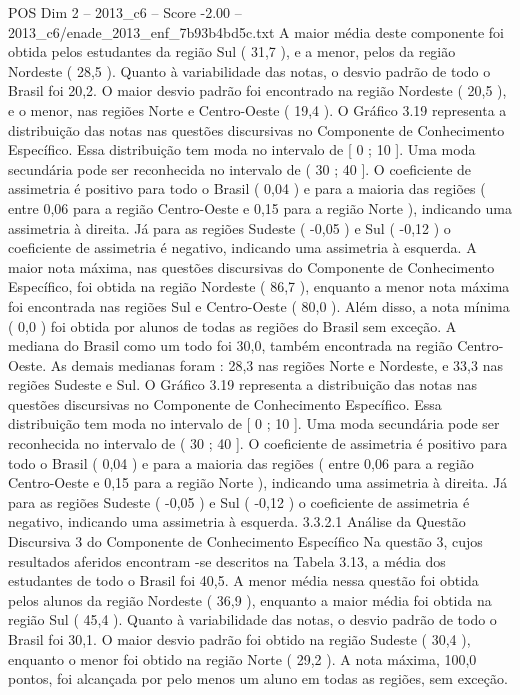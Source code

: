 \begin{textsample}{POS Dim 2 – 2013\_c6 – Score -2.00 – 2013\_c6/enade\_2013\_enf\_7b93b4bd5c.txt}
A maior média deste componente foi obtida pelos estudantes da região Sul ( 31,7 ), e a menor, pelos da região Nordeste ( 28,5 ).
Quanto à variabilidade das notas, o desvio padrão de todo o Brasil foi 20,2.
O maior desvio padrão foi encontrado na região Nordeste ( 20,5 ), e o menor, nas regiões Norte e Centro-Oeste ( 19,4 ).
O Gráfico 3.19 representa a distribuição das notas nas questões discursivas no Componente de Conhecimento Específico.
Essa distribuição tem moda no intervalo de [ 0 ; 10 ].
Uma moda secundária pode ser reconhecida no intervalo de ( 30 ; 40 ].
O coeficiente de assimetria é positivo para todo o Brasil ( 0,04 ) e para a maioria das regiões ( entre 0,06 para a região Centro-Oeste e 0,15 para a região Norte ), indicando uma assimetria à direita.
Já para as regiões Sudeste ( -0,05 ) e Sul ( -0,12 ) o coeficiente de assimetria é negativo, indicando uma assimetria à esquerda.
A maior nota máxima, nas questões discursivas do Componente de Conhecimento Específico, foi obtida na região Nordeste ( 86,7 ), enquanto a menor nota máxima foi encontrada nas regiões Sul e Centro-Oeste ( 80,0 ).
Além disso, a nota mínima ( 0,0 ) foi obtida por alunos de todas as regiões do Brasil sem exceção.
A mediana do Brasil como um todo foi 30,0, também encontrada na região Centro-Oeste.
As demais medianas foram : 28,3 nas regiões Norte e Nordeste, e 33,3 nas regiões Sudeste e Sul.
O Gráfico 3.19 representa a distribuição das notas nas questões discursivas no Componente de Conhecimento Específico.
Essa distribuição tem moda no intervalo de [ 0 ; 10 ].
Uma moda secundária pode ser reconhecida no intervalo de ( 30 ; 40 ].
O coeficiente de assimetria é positivo para todo o Brasil ( 0,04 ) e para a maioria das regiões ( entre 0,06 para a região Centro-Oeste e 0,15 para a região Norte ), indicando uma assimetria à direita.
Já para as regiões Sudeste ( -0,05 ) e Sul ( -0,12 ) o coeficiente de assimetria é negativo, indicando uma assimetria à esquerda. 3.3.2.1 Análise da Questão Discursiva 3 do Componente de Conhecimento Específico Na questão 3, cujos resultados aferidos encontram -se descritos na Tabela 3.13, a média dos estudantes de todo o Brasil foi 40,5.
A menor média nessa questão foi obtida pelos alunos da região Nordeste ( 36,9 ), enquanto a maior média foi obtida na região Sul ( 45,4 ).
Quanto à variabilidade das notas, o desvio padrão de todo o Brasil foi 30,1.
O maior desvio padrão foi obtido na região Sudeste ( 30,4 ), enquanto o menor foi obtido na região Norte ( 29,2 ).
A nota máxima, 100,0 pontos, foi alcançada por pelo menos um aluno em todas as regiões, sem exceção.

\end{textsample}
